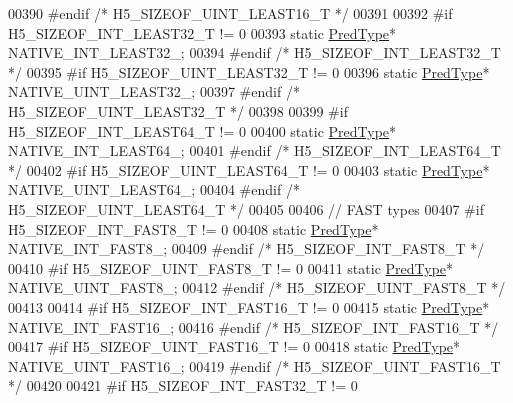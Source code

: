 \begin{DoxyCode}
00390 \textcolor{preprocessor}{#endif }\textcolor{comment}{/* H5\_SIZEOF\_UINT\_LEAST16\_T */}\textcolor{preprocessor}{}
00391 
00392 \textcolor{preprocessor}{#if H5\_SIZEOF\_INT\_LEAST32\_T != 0}
00393         \textcolor{keyword}{static} \hyperlink{class_h5_1_1_pred_type}{PredType}* NATIVE\_INT\_LEAST32\_;
00394 \textcolor{preprocessor}{#endif }\textcolor{comment}{/* H5\_SIZEOF\_INT\_LEAST32\_T */}\textcolor{preprocessor}{}
00395 \textcolor{preprocessor}{#if H5\_SIZEOF\_UINT\_LEAST32\_T != 0}
00396         \textcolor{keyword}{static} \hyperlink{class_h5_1_1_pred_type}{PredType}* NATIVE\_UINT\_LEAST32\_;
00397 \textcolor{preprocessor}{#endif }\textcolor{comment}{/* H5\_SIZEOF\_UINT\_LEAST32\_T */}\textcolor{preprocessor}{}
00398 
00399 \textcolor{preprocessor}{#if H5\_SIZEOF\_INT\_LEAST64\_T != 0}
00400         \textcolor{keyword}{static} \hyperlink{class_h5_1_1_pred_type}{PredType}* NATIVE\_INT\_LEAST64\_;
00401 \textcolor{preprocessor}{#endif }\textcolor{comment}{/* H5\_SIZEOF\_INT\_LEAST64\_T */}\textcolor{preprocessor}{}
00402 \textcolor{preprocessor}{#if H5\_SIZEOF\_UINT\_LEAST64\_T != 0}
00403         \textcolor{keyword}{static} \hyperlink{class_h5_1_1_pred_type}{PredType}* NATIVE\_UINT\_LEAST64\_;
00404 \textcolor{preprocessor}{#endif }\textcolor{comment}{/* H5\_SIZEOF\_UINT\_LEAST64\_T */}\textcolor{preprocessor}{}
00405 
00406 \textcolor{comment}{// FAST types}
00407 \textcolor{preprocessor}{#if H5\_SIZEOF\_INT\_FAST8\_T != 0}
00408         \textcolor{keyword}{static} \hyperlink{class_h5_1_1_pred_type}{PredType}* NATIVE\_INT\_FAST8\_;
00409 \textcolor{preprocessor}{#endif }\textcolor{comment}{/* H5\_SIZEOF\_INT\_FAST8\_T */}\textcolor{preprocessor}{}
00410 \textcolor{preprocessor}{#if H5\_SIZEOF\_UINT\_FAST8\_T != 0}
00411         \textcolor{keyword}{static} \hyperlink{class_h5_1_1_pred_type}{PredType}* NATIVE\_UINT\_FAST8\_;
00412 \textcolor{preprocessor}{#endif }\textcolor{comment}{/* H5\_SIZEOF\_UINT\_FAST8\_T */}\textcolor{preprocessor}{}
00413 
00414 \textcolor{preprocessor}{#if H5\_SIZEOF\_INT\_FAST16\_T != 0}
00415         \textcolor{keyword}{static} \hyperlink{class_h5_1_1_pred_type}{PredType}* NATIVE\_INT\_FAST16\_;
00416 \textcolor{preprocessor}{#endif }\textcolor{comment}{/* H5\_SIZEOF\_INT\_FAST16\_T */}\textcolor{preprocessor}{}
00417 \textcolor{preprocessor}{#if H5\_SIZEOF\_UINT\_FAST16\_T != 0}
00418         \textcolor{keyword}{static} \hyperlink{class_h5_1_1_pred_type}{PredType}* NATIVE\_UINT\_FAST16\_;
00419 \textcolor{preprocessor}{#endif }\textcolor{comment}{/* H5\_SIZEOF\_UINT\_FAST16\_T */}\textcolor{preprocessor}{}
00420 
00421 \textcolor{preprocessor}{#if H5\_SIZEOF\_INT\_FAST32\_T != 0}

\end{DoxyCode}
